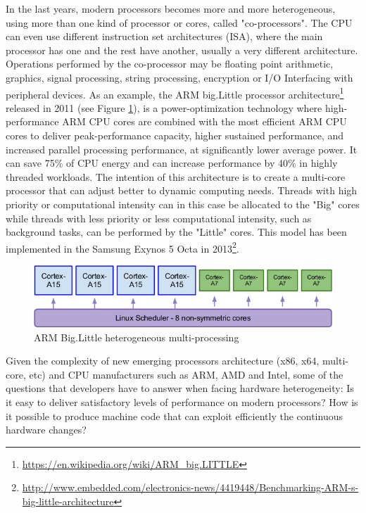 In the last years, modern processors becomes more and more heterogeneous, using more than one kind of processor or cores, called "co-processors". The CPU can even use different instruction set architectures (ISA), where the main processor has one and the rest have another, usually a very different architecture. Operations performed by the co-processor may be floating point arithmetic, graphics, signal processing, string processing, encryption or I/O Interfacing with peripheral devices. 
As an example, the ARM big.Little processor architecture\footnote{\url{https://en.wikipedia.org/wiki/ARM_big.LITTLE}} released in 2011 (see Figure \ref{fig:cortex}), is a power-optimization technology where high-performance ARM CPU cores are combined with the most efficient ARM CPU cores to deliver peak-performance capacity, higher sustained performance, and increased parallel processing performance, at significantly lower average power. It can save 75\% of CPU energy and can increase performance by 40\% in highly threaded workloads.
The intention of this architecture is to create a multi-core processor that can adjust better to dynamic computing needs.
Threads with high priority or computational intensity can in this case be allocated to the "Big" cores while threads with less priority or less computational intensity, such as background tasks, can be performed by the "Little" cores. This model has been implemented in the Samsung Exynos 5 Octa in 2013\footnote{\url{http://www.embedded.com/electronics-news/4419448/Benchmarking-ARM-s-big-little-architecture}}.


\begin{figure}[h]
	\center
	\includegraphics[scale=0.7]{Background/fig/cortex.jpg}
	\caption{ARM Big.Little heterogeneous multi-processing}
	\label{fig:cortex}
\end{figure}


Given the complexity of new emerging processors architecture (x86, x64, multi-core, etc) and CPU manufacturers such as ARM, AMD and Intel, some of the questions that developers have to answer when facing hardware heterogeneity: 
Is it easy to deliver satisfactory levels of performance on modern processors? How is it possible to produce machine code that can exploit efficiently the continuous hardware changes? 





